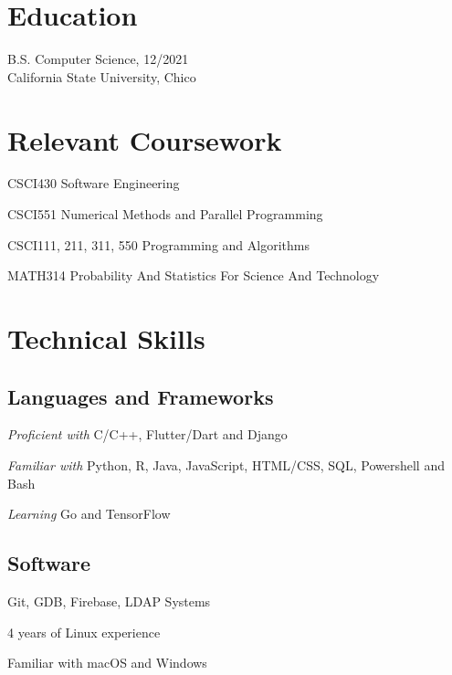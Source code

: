\documentclass[letterpaper]{article}
\renewenvironment{itemize}{
  \begin{list}{}{
    \setlength{\leftmargin}{1.5em}
  }
}{
  \end{list}
}
\begin{document}
\begin{minipage}[t]{0.475\linewidth}
    \section*{Education}
    \begin{itemize}
    \item[$\bullet$] B.S. Computer Science, 12/2021 \\
        California State University, Chico
    \end{itemize}
    \section*{Relevant Coursework}
    \begin{itemize}
        \item[$\bullet$] CSCI430 Software Engineering
        \item[$\bullet$] CSCI551 Numerical Methods and Parallel Programming
        \item[$\bullet$] CSCI111, 211, 311, 550 Programming and Algorithms
        \item[$\bullet$] MATH314 Probability And Statistics For Science And Technology
    \end{itemize}
\end{minipage}
\hspace{0.5cm}
\begin{minipage}[t]{0.475\linewidth}
    \section*{Technical Skills}
    \subsection*{Languages and Frameworks}
    \begin{itemize}
        \item[$\bullet$] \emph{Proficient with} C/C++, Flutter/Dart and Django
        \item[$\bullet$] \emph{Familiar with} Python, R, Java, JavaScript,  HTML/CSS, SQL, Powershell and Bash
        \item[$\bullet$] \emph{Learning} Go and TensorFlow
    \end{itemize}
    \subsection*{Software}
    \begin{itemize}
        \item[$\bullet$] Git, GDB, Firebase, LDAP Systems
        \item[$\bullet$] 4 years of Linux experience
        \item[$\bullet$] Familiar with macOS and Windows
    \end{itemize}
\end{minipage}
\end{document}
